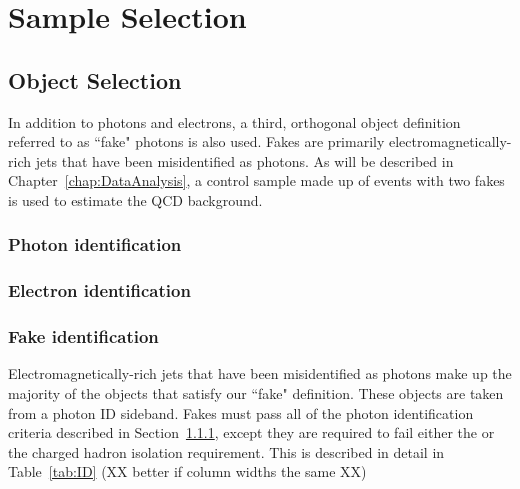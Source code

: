 \chapter{Sample Selection}
\label{chap:EventSelect}

\section{Object Selection}
\label{sec:ObjSelect}
In addition to photons and electrons, a third, orthogonal object definition referred to as ``fake" photons is also used. 
Fakes are primarily electromagnetically-rich jets that have been misidentified as photons. As will be described in Chapter~\ref{chap:DataAnalysis},
a control sample made up of events with two fakes is used to estimate the QCD background. 

\subsection{Photon identification}
\label{sec:phoID}

\subsection{Electron identification}
\label{sec:eleID}


\subsection{Fake identification}
\label{sec:fakeID}
Electromagnetically-rich jets that have been misidentified as photons make up the majority of the objects 
that satisfy our ``fake" definition. These objects are taken from a photon ID sideband. Fakes must
pass all of the photon identification criteria described in Section~\ref{sec:phoID}, except they are required to
fail either the \sigmaietaieta or the charged hadron isolation requirement. This is described in detail in Table~\ref{tab:ID}
(XX better if column widths the same XX)

